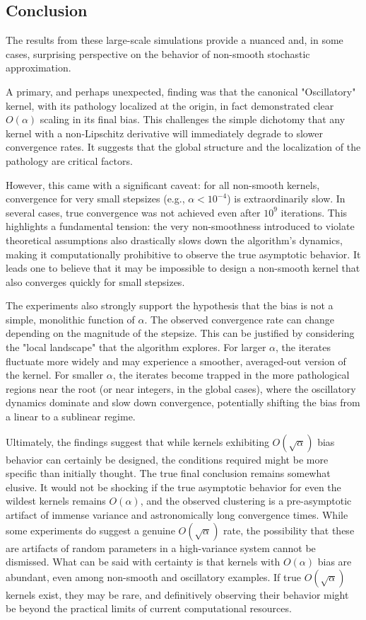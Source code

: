 \documentclass[a4paper]{article}
\begin{document}
\subsection*{Conclusion}

The results from these large-scale simulations provide a nuanced and, in some cases, surprising perspective on the behavior of non-smooth stochastic approximation.

A primary, and perhaps unexpected, finding was that the canonical "Oscillatory" kernel, with its pathology localized at the origin, in fact demonstrated clear $O(\alpha)$ scaling in its final bias. This challenges the simple dichotomy that any kernel with a non-Lipschitz derivative will immediately degrade to slower convergence rates. It suggests that the global structure and the localization of the pathology are critical factors.

However, this came with a significant caveat: for all non-smooth kernels, convergence for very small stepsizes (e.g., $\alpha < 10^{-4}$) is extraordinarily slow. In several cases, true convergence was not achieved even after $10^9$ iterations. This highlights a fundamental tension: the very non-smoothness introduced to violate theoretical assumptions also drastically slows down the algorithm's dynamics, making it computationally prohibitive to observe the true asymptotic behavior. It leads one to believe that it may be impossible to design a non-smooth kernel that also converges quickly for small stepsizes.

The experiments also strongly support the hypothesis that the bias is not a simple, monolithic function of $\alpha$. The observed convergence rate can change depending on the magnitude of the stepsize. This can be justified by considering the "local landscape" that the algorithm explores. For larger $\alpha$, the iterates fluctuate more widely and may experience a smoother, averaged-out version of the kernel. For smaller $\alpha$, the iterates become trapped in the more pathological regions near the root (or near integers, in the global cases), where the oscillatory dynamics dominate and slow down convergence, potentially shifting the bias from a linear to a sublinear regime.

Ultimately, the findings suggest that while kernels exhibiting $O(\sqrt{\alpha})$ bias behavior can certainly be designed, the conditions required might be more specific than initially thought. The true final conclusion remains somewhat elusive. It would not be shocking if the true asymptotic behavior for even the wildest kernels remains $O(\alpha)$, and the observed clustering is a pre-asymptotic artifact of immense variance and astronomically long convergence times. While some experiments do suggest a genuine $O(\sqrt{\alpha})$ rate, the possibility that these are artifacts of random parameters in a high-variance system cannot be dismissed. What can be said with certainty is that kernels with $O(\alpha)$ bias are abundant, even among non-smooth and oscillatory examples. If true $O(\sqrt{\alpha})$ kernels exist, they may be rare, and definitively observing their behavior might be beyond the practical limits of current computational resources.


	 
	
	
	
\end{document}

